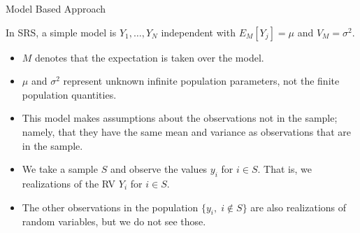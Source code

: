 \documentclass[10pt]{beamer}\usepackage[]{graphicx}\usepackage[]{xcolor}
\begin{document}
\begin{frame}{Model Based Approach}

\begin{block}{In SRS, a simple model is}
$Y_1,\dots,Y_N$ independent with $E_M[Y_j]=\mu$ and $V_M=\sigma^2$. 
\begin{itemize}
\item $M$ denotes that the expectation is taken over the model.
\item $\mu$ and $\sigma^2$ represent unknown infinite population parameters, not the finite population quantities.
\item This model makes assumptions about the observations not in the sample; namely, that they have the same mean and variance as observations that are in the sample. 
\item We take a sample $S$ and observe the values $y_i$ for $i\in S$. That is, we realizations of the RV $Y_i$ for $i\in S$.
\item The other observations in the population $\{y_i,\; i\notin S\}$ are also realizations of random variables, but we do not see those. 
\end{itemize}
\end{block}

\end{frame}
\end{document}
